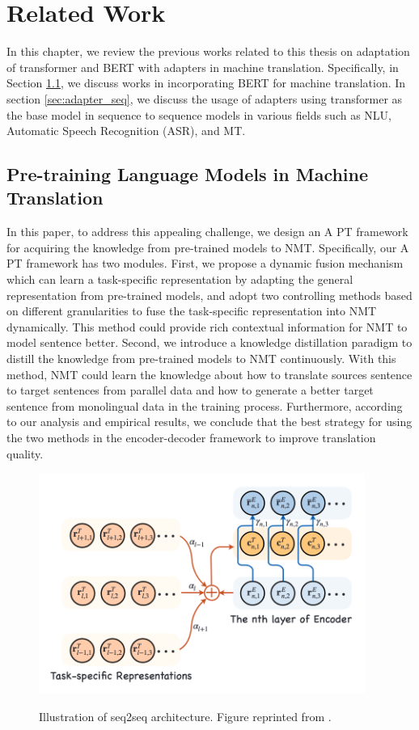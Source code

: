 \chapter{Related Work}

In this chapter, we review the previous works related to this thesis on adaptation of transformer and BERT with adapters in machine translation. Specifically, in Section \ref{sec:prelm_mt}, we discuss works in incorporating BERT for machine translation. In section \ref{sec:adapter_seq}, we discuss the usage of adapters using transformer as the base model in sequence to sequence models in various fields such as NLU, Automatic Speech Recognition (ASR), and MT.

\section{Pre-training Language Models in Machine Translation}
\label{sec:prelm_mt}

\cite{weng2020acquiring} In this paper, to address this appealing challenge, we design an A PT framework for acquiring the knowledge from pre-trained models to NMT. Specifically, our A PT framework has two modules. First, we propose a dynamic fusion mechanism which can learn a task-specific representation by adapting the general representation from pre-trained models, and adopt two controlling methods based on different granularities to fuse the task-specific representation into NMT dynamically. This method could provide rich contextual information for NMT to model sentence better. Second, we introduce a knowledge distillation paradigm to distill the knowledge from pre-trained models to NMT continuously. With this method, NMT could learn the knowledge about how to translate sources sentence to target sentences from parallel data and how to generate a better target sentence from monolingual data in the training process. Furthermore, according to our analysis and empirical results, we conclude that the best strategy for using the two methods in the encoder-decoder framework to improve translation quality.

\begin{figure}[h]
    {\includegraphics[width=0.95\textwidth]{img/dynamic_fusion.png}}
    \centering
    \caption{Illustration of seq2seq architecture. Figure reprinted from \cite{weng2020acquiring}.}
    \label{img:dyn_fn}
\end{figure}


